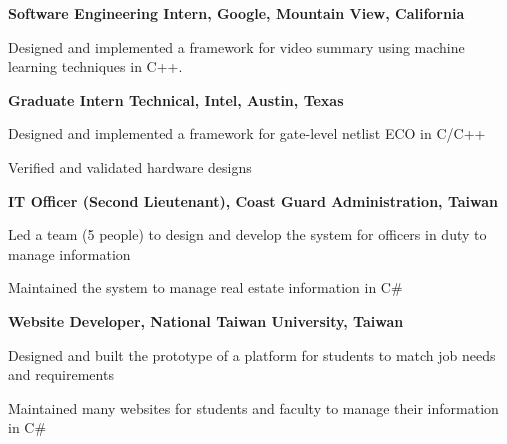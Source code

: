 \begin{myexp}
\item \textbf{Software Engineering Intern, Google, Mountain View, California}
    \begin{mybullet}
        \item Designed and implemented a framework for video summary using
            machine learning techniques in C++.
    \end{mybullet}
\item \textbf{Graduate Intern Technical, Intel, Austin, Texas}   
    \begin{mybullet}
        \item Designed and implemented a framework for gate-level netlist ECO
            in C/C++
        \item Verified and validated hardware designs
    \end{mybullet}
\item \textbf{IT Officer (Second Lieutenant), Coast Guard Administration, 
    Taiwan }   
    \begin{mybullet}
        \item Led a team (5 people) to design and develop the system for 
            officers in duty to manage information
        \item Maintained the system to manage real estate information in C\#
    \end{mybullet}
\item \textbf{Website Developer, National Taiwan University, Taiwan} 
    \begin{mybullet}
        \item Designed and built the prototype of a platform for students to 
            match job needs and requirements
        \item Maintained many websites for students and faculty to manage 
            their information in C\#
    \end{mybullet}
\end{myexp}


